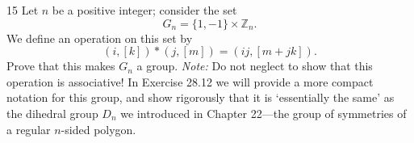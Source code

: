 \begin{problem}{15}
    Let $n$ be a positive integer; consider the set
    \[G_n = \{1, -1\} \times \mathbb{Z}_n.\]
    We define an operation on this set by
    \[(i, [k]) * (j, [m]) = (ij, [m + jk]).\]
    Prove that this makes $G_n$ a group. \emph{Note:} Do not neglect to show that this
    operation is associative! In Exercise 28.12 we will provide a more compact notation
    for this group, and show rigorously that it is `essentially the same' as the dihedral
    group $D_n$ we introduced in Chapter 22---the group of symmetries of a regular
    $n$-sided polygon.
\end{problem}
\unsolved
